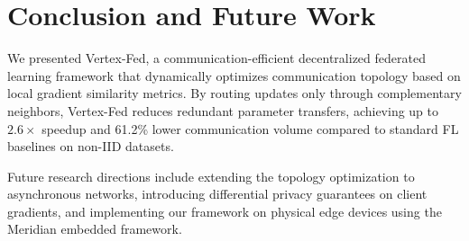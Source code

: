 \section{Conclusion and Future Work}
\label{sec:conclusion}
We presented Vertex-Fed, a communication-efficient decentralized federated learning framework that dynamically optimizes communication topology based on local gradient similarity metrics. By routing updates only through complementary neighbors, Vertex-Fed reduces redundant parameter transfers, achieving up to $2.6\times$ speedup and 61.2\% lower communication volume compared to standard FL baselines on non-IID datasets.

Future research directions include extending the topology optimization to asynchronous networks, introducing differential privacy guarantees on client gradients, and implementing our framework on physical edge devices using the Meridian embedded framework.
